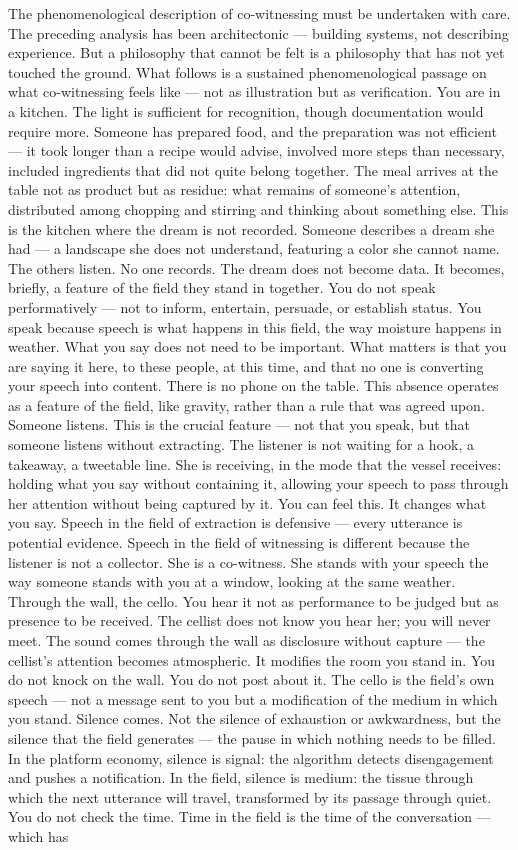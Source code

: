The phenomenological description of co-witnessing must be undertaken with care. The preceding analysis has been architectonic --- building systems, not describing experience. But a philosophy that cannot be felt is a philosophy that has not yet touched the ground. What follows is a sustained phenomenological passage on what co-witnessing feels like — not as illustration but as verification. You are in a kitchen. The light is sufficient for recognition, though documentation would require more. Someone has prepared food, and the preparation was not efficient — it took longer than a recipe would advise, involved more steps than necessary, included ingredients that did not quite belong together. The meal arrives at the table not as product but as residue: what remains of someone’s attention, distributed among chopping and stirring and thinking about something else. This is the kitchen where the dream is not recorded. Someone describes a dream she had — a landscape she does not understand, featuring a color she cannot name. The others listen. No one records. The dream does not become data. It becomes, briefly, a feature of the field they stand in together. You do not speak performatively — not to inform, entertain, persuade, or establish status. You speak because speech is what happens in this field, the way moisture happens in weather. What you say does not need to be important. What matters is that you are saying it here, to these people, at this time, and that no one is converting your speech into content. There is no phone on the table. This absence operates as a feature of the field, like gravity, rather than a rule that was agreed upon. Someone listens. This is the crucial feature — not that you speak, but that someone listens without extracting. The listener is not waiting for a hook, a takeaway, a tweetable line. She is receiving, in the mode that the vessel receives: holding what you say without containing it, allowing your speech to pass through her attention without being captured by it. You can feel this. It changes what you say. Speech in the field of extraction is defensive — every utterance is potential evidence. Speech in the field of witnessing is different because the listener is not a collector. She is a co-witness. She stands with your speech the way someone stands with you at a window, looking at the same weather. Through the wall, the cello. You hear it not as performance to be judged but as presence to be received. The cellist does not know you hear her; you will never meet. The sound comes through the wall as disclosure without capture — the cellist’s attention becomes atmospheric. It modifies the room you stand in. You do not knock on the wall. You do not post about it. The cello is the field’s own speech — not a message sent to you but a modification of the medium in which you stand. Silence comes. Not the silence of exhaustion or awkwardness, but the silence that the field generates — the pause in which nothing needs to be filled. In the platform economy, silence is signal: the algorithm detects disengagement and pushes a notification. In the field, silence is medium: the tissue through which the next utterance will travel, transformed by its passage through quiet. You do not check the time. Time in the field is the time of the conversation — which has 